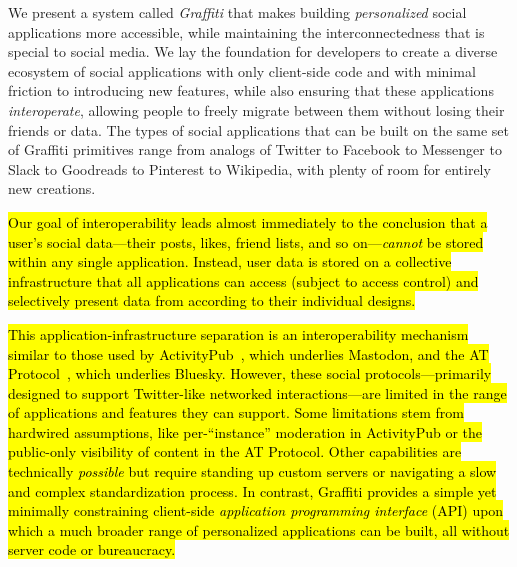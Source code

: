 We present a system called \emph{Graffiti} that makes
building \emph{personalized} social applications
more accessible,
while maintaining the interconnectedness that is special to social media.
We lay the foundation for developers to create a diverse ecosystem
of social applications
with only client-side code and with minimal friction
to introducing new features,
while also ensuring that these applications \emph{interoperate},
allowing people to freely migrate between them without
losing their friends or data.
The types of social applications that can be built on the same set of Graffiti primitives range from analogs of Twitter to Facebook to Messenger to Slack to Goodreads to Pinterest to Wikipedia,
with plenty of room for entirely new creations.

\hl{%
Our goal of interoperability leads almost immediately
to the conclusion that a user's
social data---their posts, likes, friend lists, and so on---\emph{cannot}
be stored within any single application.
Instead, user data is stored on a collective infrastructure
that all applications can access (subject to access control)
and selectively present data from according to their individual designs.
}%

\hl{%
This application-infrastructure separation
is an interoperability mechanism similar to
those used by
ActivityPub~{\cite{activitypub}},
which underlies Mastodon,
and the AT Protocol~{\cite{bluesky}}, which underlies Bluesky.
However, these social protocols---primarily designed to support
Twitter-like networked interactions---are limited in the range of applications
and features they can support.
Some limitations stem from hardwired assumptions,
like per-``instance'' moderation in ActivityPub
or the public-only visibility of content in the AT Protocol.
Other capabilities are technically \emph{possible}
but require standing up custom servers or navigating
a slow and complex standardization process.
In contrast, Graffiti provides a simple yet minimally constraining
client-side \emph{application programming interface} (API)
upon which a much broader range of personalized applications can be built, all
without server code or bureaucracy.
}%


